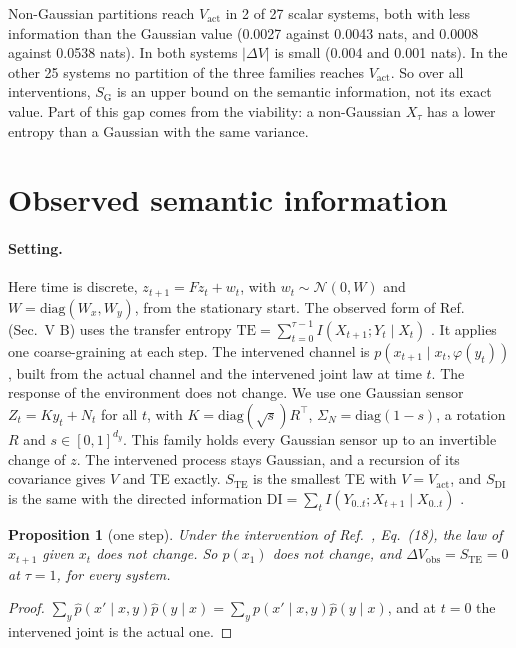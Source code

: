 \documentclass[11pt]{article}
\newtheorem{proposition}{Proposition}
\newcommand{\Vact}{V_{\mathrm{act}}}
\newcommand{\SG}{S_{\mathrm{G}}}
\newcommand{\STE}{S_{\mathrm{TE}}}
\newcommand{\SDI}{S_{\mathrm{DI}}}
\begin{document}
Non-Gaussian partitions reach $\Vact$ in 2 of 27 scalar systems, both with less information than the Gaussian value
(0.0027 against 0.0043 nats, and 0.0008 against 0.0538 nats). In both systems $|\Delta V|$ is small (0.004 and 0.001
nats). In the other 25 systems no partition of the three families reaches $\Vact$. So over all interventions, $\SG$ is
an upper bound on the semantic information, not its exact value. Part of this gap comes from the viability: a
non-Gaussian $X_\tau$ has a lower entropy than a Gaussian with the same variance.

\section{Observed semantic information}
\label{sec:dynamic}

\paragraph{Setting.} Here time is discrete, $z_{t+1}=Fz_t+w_t$, with $w_t\sim\mathcal{N}(0,W)$ and
$W=\mathrm{diag}(W_x,W_y)$, from the stationary start. The observed form of Ref.~\cite{KolchinskyWolpert18} (Sec.~V B)
uses the transfer entropy $\mathrm{TE}=\sum_{t=0}^{\tau-1}I(X_{t+1};Y_t\mid X_t)$ \cite{Schreiber00}. It applies one
coarse-graining at each step. The intervened channel is $p(x_{t+1}\mid x_t,\varphi(y_t))$, built from the actual
channel and the intervened joint law at time $t$. The response of the environment does not change. We use one
Gaussian sensor $Z_t=Ky_t+N_t$ for all $t$, with $K=\mathrm{diag}(\sqrt s)R^\top$, $\Sigma_N=\mathrm{diag}(1-s)$, a
rotation $R$ and $s\in[0,1]^{d_y}$. This family holds every Gaussian sensor up to an invertible change of $z$. The
intervened process stays Gaussian, and a recursion of its covariance gives $V$ and TE exactly. $\STE$ is the smallest
TE with $V=\Vact$, and $\SDI$ is the same with the directed information
$\mathrm{DI}=\sum_tI(Y_{0..t};X_{t+1}\mid X_{0..t})$ \cite{Massey90}.

\begin{proposition}[one step]\label{prop:F1}
Under the intervention of Ref.~\cite{KolchinskyWolpert18}, Eq.~(18), the law of $x_{t+1}$ given $x_t$ does not change.
So $p(x_1)$ does not change, and $\Delta V_{\mathrm{obs}}=\STE=0$ at $\tau=1$, for every system.
\end{proposition}
\begin{proof}
$\sum_y\hat p(x'\mid x,y)\hat p(y\mid x)=\sum_y p(x'\mid x,y)\hat p(y\mid x)$, and at $t=0$ the intervened joint is the
actual one.
\end{proof}
\end{document}
